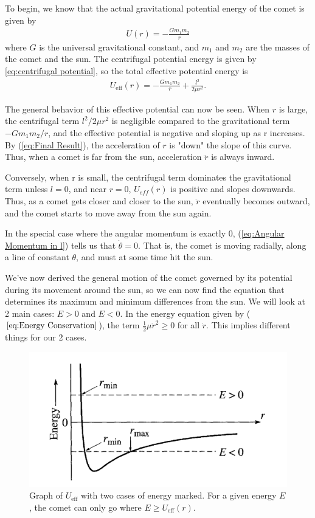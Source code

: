 \documentclass[10pt, psamsfonts]{amsart}
\theoremstyle{definition}
\theoremstyle{remark}
\numberwithin{equation}{section}
\begin{document}
To begin, we know that the actual gravitational potential energy of the comet is given by 
\begin{align}
  \label{eq:grav pot eng}
  U(r) = -\frac{Gm_1m_2}{r} 
\end{align}
where $G$ is the universal gravitational constant, and $m_1$ and $m_2$ are the masses of the comet and the sun. The centrifugal potential energy is given by \ref{eq:centrifugal potential}, so the total effective potential energy is
\begin{align}
  \label{eq:effective pot total}
  U_{\text{eff}}(r) = -\frac{Gm_1m_2}{r} + \frac{l^2}{2\mu r^2}.
\end{align}

The general behavior of this effective potential can now be seen. When $r$ is large, the centrifugal term $l^2/2\mu r^2$ is negligible compared to the gravitational term $-Gm_1m_2/r$, and the effective potential is negative and sloping up as r increases. By (\ref{eq:Final Result}), the acceleration of $r$ is "down" the slope of this curve. Thus, when a comet is far from the sun, acceleration $\ddot{r}$ is always inward.

Conversely, when r is small, the centrifugal term dominates the gravitational term unless $l = 0$, and near $r = 0$, $U_{eff}(r)$ is positive and slopes downwards. Thus, as a comet gets closer and closer to the sun, $\ddot{r}$ eventually becomes outward, and the comet starts to move away from the sun again.

In the special case where the angular momentum is exactly 0, (\ref{eq:Angular Momentum in l}) tells us that $\dot{\theta} = 0$. That is, the comet is moving radially, along a line of constant $\theta$, and must at some time hit the sun.

We've now derived the general motion of the comet governed by its potential during its movement around the sun, so we can now find the equation that determines its maximum and minimum differences from the sun. We will look at 2 main cases: $E>0$ and $E<0$. In the energy equation given by ($\ref{eq:Energy Conservation}$), the term $\frac{1}{2} \mu \dot{r}^2 \geq 0$ for all $\dot{r}$. This implies different things for our 2 cases.

\begin{figure}[h]
\label{fig:1}
\caption{Graph of $U_{\text{eff}}$ with two cases of energy marked. For a given energy $E$, the comet can only go where $E \geq U_\text{eff}(r)$.}
\includegraphics[scale=0.5]{fig1.png}
\end{figure}
\end{document}
